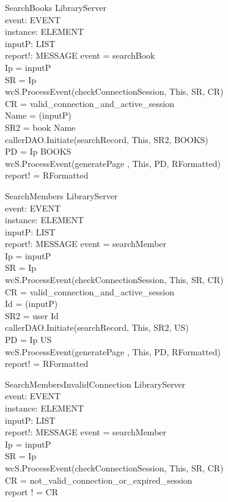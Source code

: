 \begin{schema}{SearchBooks}
\Xi LibraryServer \\
event: EVENT \\
instance: ELEMENT \\
inputP: LIST \\
report!: MESSAGE
\where event = searchBook \\
Ip = \head inputP \\
SR = \lseq Ip \rseq \\ 
wcS.ProcessEvent(checkConnectionSession, This, SR, CR) \\
CR = valid\_connection\_and\_active\_session \\
Name = \head (\tail inputP) \\
SR2 = \lseq book Name \rseq \\
callerDAO.Initiate(searchRecord, This, SR2, BOOKS) \\
PD = \lseq Ip BOOKS \rseq \\
wcS.ProcessEvent(generatePage , This, PD, RFormatted) \\
report! = RFormatted
\end{schema}

\begin{schema}{SearchMembers}
\Xi LibraryServer \\
event: EVENT \\
instance: ELEMENT \\
inputP: LIST \\
report!: MESSAGE
\where event = searchMember \\
Ip = \head inputP \\
SR = \lseq Ip \rseq \\ 
wcS.ProcessEvent(checkConnectionSession, This, SR, CR) \\
CR = valid\_connection\_and\_active\_session \\
Id = \head (\tail inputP) \\
SR2 = \lseq user Id \rseq \\
callerDAO.Initiate(searchRecord, This, SR2, US) \\
PD = \lseq Ip US \rseq \\
wcS.ProcessEvent(generatePage , This, PD, RFormatted) \\
report! = RFormatted
\end{schema}

\begin{schema}{SearchMembersInvalidConnection}
\Xi LibraryServer \\
event: EVENT \\
instance: ELEMENT \\
inputP: LIST \\
report!: MESSAGE
\where event = searchMember \\
Ip = \head inputP \\
SR = \lseq Ip \rseq \\ 
wcS.ProcessEvent(checkConnectionSession, This, SR, CR) \\
CR = not\_valid\_connection\_or\_expired\_session \\ 
report ! = CR
\end{schema}

